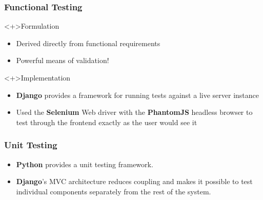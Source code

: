 
\begin{frame}
  \frametitle{Functional Testing}

  \begin{block}<+>{Formulation}
    \begin{itemize}
      \item Derived directly from functional requirements
      \item Powerful means of validation!
    \end{itemize}
  \end{block}

  \begin{block}<+>{Implementation}
    \begin{itemize}
      \item \textbf{Django} provides a framework for running tests against a
        live server instance
      \item Used the \textbf{Selenium} Web driver with the \textbf{PhantomJS}
        headless browser to test through the frontend exactly as the user would
        see it
    \end{itemize}
  \end{block}
\end{frame}

\begin{frame}
  \frametitle{Unit Testing}

  \begin{itemize}
    \item \textbf{Python} provides a unit testing framework.
    \item \textbf{Django}'s MVC architecture reduces coupling and makes
      it possible to test individual components separately from the rest
      of the system.
  \end{itemize}
\end{frame}
